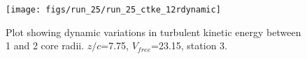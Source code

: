 \begin{figure}[H]
\centering
\texttt{[image: figs/run\_25/run\_25\_ctke\_12rdynamic]}
\caption{Plot showing dynamic variations in turbulent kinetic energy between 1 and 2 core radii. $z/c$=7.75, $V_{free}$=23.15, station 3.}
\label{fig:run_25_ctke_12rdynamic}
\end{figure}


